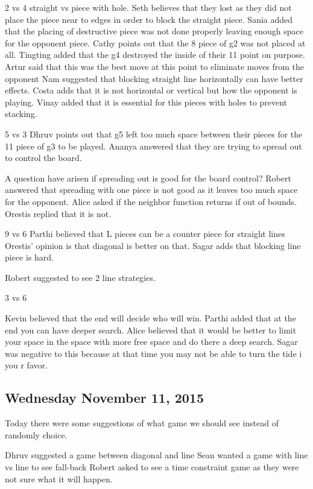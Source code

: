 2 vs 4
straight vs piece with hole.
Seth believes that they lost as they did not place the piece near to edges in order to block the straight piece.
Sania added that the placing of destructive piece was not done properly leaving enough space for the opponent piece.
Cathy points out that the 8 piece of g2 was not placed at all.
Tingting added that the g4 destroyed the inside of their 11 point on purpose.
Artur said that this was the best move at this point to eliminate moves from the opponent
Nam suggested that blocking straight line horizontally can have better effects.
Costa adds that it is not horizontal or vertical but how the opponent is playing.
Vinay added that it is essential for this pieces with holes to prevent stacking.


5 vs 3
Dhruv points out that g5 left too much space between their pieces for the 11 piece of g3 to be played.
Ananya answered that they are trying to spread out to control the board.

A question have arisen if spreading out is good for the board control?
Robert answered that spreading with one piece is not good as it leaves too much space for the opponent.
Alice asked if the neighbor function returns if out of bounds. Orestis replied that it is not.

9 vs 6 
Parthi believed that L pieces can be a counter piece for straight lines
Orestis’ opinion is that diagonal is better on that.
Sagar adds that blocking line piece is hard.

Robert suggested to see 2 line strategies.


3 vs 6

Kevin believed that the end will decide who will win.
Parthi added that at the end you can have deeper search.
Alice believed that it would be better to limit your space in the space with more free space and do there a deep search.
Sagar was negative to this because at that time you may not be able to turn the tide i you r favor.

\subsection{Wednesday November 11, 2015}
Today there were some suggestions of what game we should see instead of randomly choice.

Dhruv suggested a game between diagonal and line
Sean wanted a game with line vs line to see fall-back
Robert asked to see a  time constraint game as they were not sure what it will happen.



